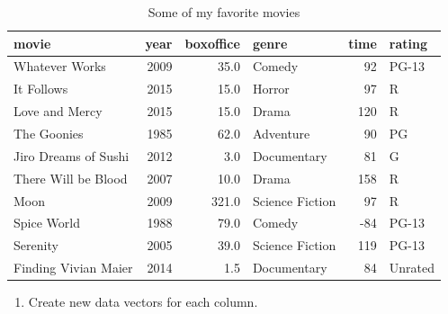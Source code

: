 \documentclass[]{book}
\providecommand{\tightlist}{%
  \setlength{\itemsep}{0pt}\setlength{\parskip}{0pt}}
\theoremstyle{definition}
\theoremstyle{definition}
\theoremstyle{remark}
\begin{document}
\begin{table}

\caption{\label{tab:unnamed-chunk-231}Some of my favorite movies}
\centering
\begin{tabular}[t]{l|r|r|l|r|l}
\hline
movie & year & boxoffice & genre & time & rating\\
\hline
Whatever Works & 2009 & 35.0 & Comedy & 92 & PG-13\\
\hline
It Follows & 2015 & 15.0 & Horror & 97 & R\\
\hline
Love and Mercy & 2015 & 15.0 & Drama & 120 & R\\
\hline
The Goonies & 1985 & 62.0 & Adventure & 90 & PG\\
\hline
Jiro Dreams of Sushi & 2012 & 3.0 & Documentary & 81 & G\\
\hline
There Will be Blood & 2007 & 10.0 & Drama & 158 & R\\
\hline
Moon & 2009 & 321.0 & Science Fiction & 97 & R\\
\hline
Spice World & 1988 & 79.0 & Comedy & -84 & PG-13\\
\hline
Serenity & 2005 & 39.0 & Science Fiction & 119 & PG-13\\
\hline
Finding Vivian Maier & 2014 & 1.5 & Documentary & 84 & Unrated\\
\hline
\end{tabular}
\end{table}

\begin{enumerate}
\def\labelenumi{\arabic{enumi}.}
\setcounter{enumi}{-1}
\tightlist
\item
  Create new data vectors for each column.
\end{enumerate}
\end{document}
